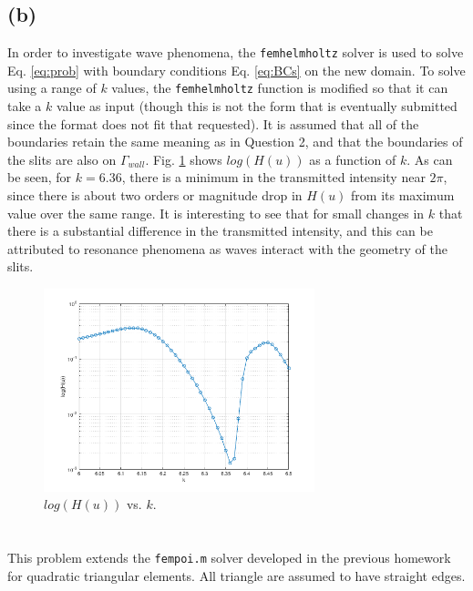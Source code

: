 \documentclass[10pt]{article}
\begin{document}
\subsection{(b)}
In order to investigate wave phenomena, the {\tt femhelmholtz} solver is used to solve Eq. \eqref{eq:prob} with boundary conditions Eq. \eqref{eq:BCs} on the new domain. To solve using a range of \(k\) values, the {\tt femhelmholtz} function is modified so that it can take a \(k\) value as input (though this is not the form that is eventually submitted since the format does not fit that requested). It is assumed that all of the boundaries retain the same meaning as in Question 2, and that the boundaries of the slits are also on \(\Gamma_{wall}\). Fig. \ref{fig:wavephenomena} shows \(log(H(u))\) as a function of \(k\). As can be seen, for \(k=6.36\), there is a minimum in the transmitted intensity near \(2\pi\), since there is about two orders or magnitude drop in \(H(u)\) from its maximum value over the same range. It is interesting to see that for small changes in \(k\) that there is a substantial difference in the transmitted intensity, and this can be attributed to resonance phenomena as waves interact with the geometry of the slits.

\begin{figure}[H]
\centering
\includegraphics[width=0.7\textwidth]{wave_phenomena.png}
\caption{\(log(H(u))\) vs. \(k\).}
\label{fig:wavephenomena}
\end{figure}






\section{}

This problem extends the {\tt fempoi.m} solver developed in the previous homework for quadratic triangular elements. All triangle are assumed to have straight edges. 
\end{document}
